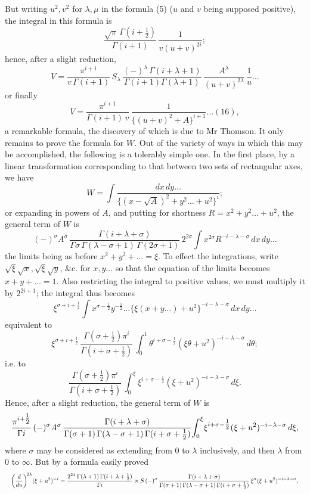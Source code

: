 \documentclass[11pt]{article}
\begin{document}
\noindent But writing $u^{2}, v^{2}$ for $\lambda,\mu$ in the formula (5) ($u$ and $v$ being supposed positive), the integral in this formula is
\[
  \frac{\sqrt{\pi}\,\Gamma(i+\tfrac{1}{2})}{\Gamma(i+1)}\,\frac{1}{v(u+v)^{2i}};
\]
hence, after a slight reduction,
\[
  V = \frac{\pi^{i+1}}{v\,\Gamma(i+1)}\,S_\lambda\,\frac{(-)^{\lambda}\,\Gamma(i+\lambda+1)}{\Gamma(i+1)\Gamma(\lambda+1)}\,\frac{A^{\lambda}}{(u+v)^{2\lambda}}\,\frac{1}{u}\dots
\]
or finally
\[
  V = \frac{\pi^{i+1}}{\Gamma(i+1)\,v}\,\frac{1}{\{(u+v)^{2}+A\}^{i+1}}\dots(16),
\]
a remarkable formula, the discovery of which is due to Mr Thomson. It only remains to prove the formula for $W$. Out of the variety of ways in which this may be accomplished, the following is a tolerably simple one. In the first place, by a linear transformation corresponding to that between two sets of rectangular axes, we have
\[
  W = \int\!\frac{dx\,dy\dots}{\{(x-\sqrt{A})^{2} + y^{2}\dots + u^{2}\}^{i}};
\]
or expanding in powers of $A$, and putting for shortness $R = x^{2} + y^{2}\dots + u^{2}$, the general term of $W$ is
\[
  (-)^{\sigma}A^{\sigma}\,\frac{\Gamma(i+\lambda+\sigma)}{\Gamma\sigma\,\Gamma(\lambda-\sigma+1)\,\Gamma(2\sigma+1)}\,2^{2\sigma}\!\int\!x^{2\sigma}R^{-i-\lambda-\sigma}\,dx\,dy\dots
\]
the limits being as before $x^{2} + y^{2} + \dots = \xi$. To effect the integrations, write $\sqrt{\xi}\sqrt{x}, \sqrt{\xi}\sqrt{y}$, \&c. for $x, y\dots$ so that the equation of the limits becomes $x + y + \dots = 1$. Also restricting the integral to positive values, we must multiply it by $2^{2i+1}$; the integral thus becomes
\[
  \xi^{\sigma+i+\tfrac{1}{2}}\!\int\!x^{\sigma-\tfrac{1}{2}}y^{-\tfrac{1}{2}}\dots\{\xi(x+y\dots) + u^{2}\}^{-i-\lambda-\sigma}\,dx\,dy\dots
\]
equivalent to
\[
  \xi^{\sigma+i+\tfrac{1}{2}}\,\frac{\Gamma(\sigma+\tfrac{1}{2})\pi^{i}}{\Gamma(i+\sigma+\tfrac{1}{2})}\,\int_{0}^{1}\!\theta^{i+\sigma-\tfrac{1}{2}}(\xi\theta + u^{2})^{-i-\lambda-\sigma}\,d\theta;
\]
i.e. to
\[
  \frac{\Gamma(\sigma+\tfrac{1}{2})\pi^{i}}{\Gamma(i+\sigma+\tfrac{1}{2})}\,\int_{0}^{\xi}\!\xi^{i+\sigma-\tfrac{1}{2}}(\xi + u^{2})^{-i-\lambda-\sigma}\,d\xi.
\]
Hence, after a slight reduction, the general term of $W$ is
\[
  \resizebox{\textwidth}{!}{$\displaystyle
  \frac{\pi^{i+\tfrac{1}{2}}}{\Gamma i}\,(-)^{\sigma}A^{\sigma}\,\frac{\Gamma(i+\lambda+\sigma)}{\Gamma(\sigma+1)\,\Gamma(\lambda-\sigma+1)\,\Gamma(i+\sigma+\tfrac{1}{2})}\!\int_{0}^{\xi}\!\xi^{i+\sigma-\tfrac{1}{2}}(\xi+u^{2})^{-i-\lambda-\sigma}\,d\xi,
  $}
\]
where $\sigma$ may be considered as extending from $0$ to $\lambda$ inclusively, and then $\lambda$ from $0$ to $\infty$. But by a formula easily proved
\[
  \resizebox{\textwidth}{!}{$\displaystyle
  \!\left(\frac{d}{du}\right)^{\!2\lambda}\!(\xi+u^{2})^{-i} = \frac{2^{2\lambda}\,\Gamma(\lambda+1)\,\Gamma(i+\lambda+\tfrac{1}{2})}{\Gamma i}\times
  S\,(-)^{\sigma}\,\frac{\Gamma(i+\lambda+\sigma)}{\Gamma(\sigma+1)\,\Gamma(\lambda-\sigma+1)\,\Gamma(i+\sigma+\tfrac{1}{2})}\,\xi^{\sigma}(\xi+u^{2})^{-i-\lambda-\sigma},
  $}
\]
\end{document}
